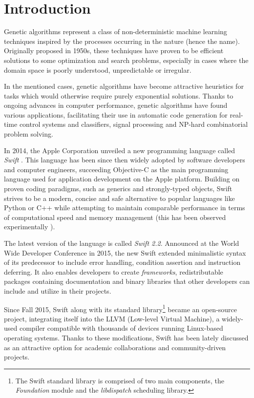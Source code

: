 \chapter{Introduction}

Genetic algorithms represent a class of non-deterministic machine learning techniques inspired by the processes occurring in the nature (hence the name). Originally proposed in 1950s, these techniques have proven to be efficient solutions to some optimization and search problems, especially in cases where the domain space is poorly understood, unpredictable or irregular.

In the mentioned cases, genetic algorithms have become attractive heu\-ristics for tasks which would otherwise require purely exponential solutions. Thanks to ongoing advances in computer performance, genetic algorithms have found various applications, facilitating their use in automatic code generation for real-time control systems and classifiers, signal processing and NP-hard combinatorial problem solving.

In 2014, the Apple Corporation unveiled a new programming language called \textit{Swift} \cite{SwiftReference}. This language has been since then widely adopted by software developers and computer engineers, succeeding Objective-C as the main programming language used for application development on the Apple platform. Building on proven coding paradigms, such as generics and strongly-typed objects, Swift strives to be a modern, concise and safe alternative to popular languages like Python or C++ while attempting to maintain comparable performance in terms of computational speed and memory management (this has been observed experimentally \cite{PrimateLabsBenchmark}).

The latest version of the language is called \textit{Swift 2.2}. Announced at the World Wide Developer Conference in 2015, the new Swift extended minimalistic syntax of its predecessor to include error handling, condition assertion and instruction deferring. It also enables developers to create \textit{frameworks}, redistributable packages containing documentation and binary libraries that other developers can include and utilize in their projects.

Since Fall 2015, Swift along with its standard library\footnote{The Swift standard library is comprised of two main components, the \textit{Foundation} module and the \textit{libdispatch} scheduling library.} became an open-source project, integrating itself into the LLVM (Low-level Virtual Machine), a widely-used compiler compatible with thousands of devices running Linux-based operating systems. Thanks to these modifications, Swift has been lately discussed as an attractive option for academic collaborations and community-driven projects.

